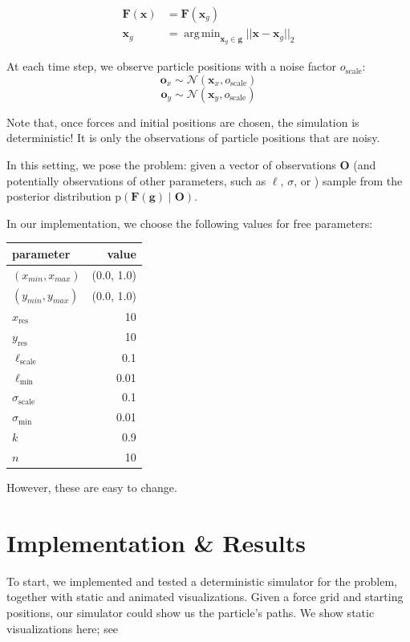 \documentclass[11pt]{article}
\DeclareMathOperator*{\argmin}{arg\,min}
\newcommand{\prob}[0]{\mathrm{p}}
\newcommand{\samples}[0]{\sim}
\newcommand{\given}[0]{\;|\;}
\newcommand{\xv}[0]{\mathbf{x}}
\newcommand{\Fv}[0]{\mathbf{F}}
\newcommand{\xres}[0]{x_{\mathrm{res}}}
\newcommand{\yres}[0]{y_{\mathrm{res}}}
\newcommand{\gv}[0]{\mathbf{g}}
\newcommand{\ov}[0]{\mathbf{o}}
\newcommand{\Ov}[0]{\mathbf{O}}
\newcommand{\scale}[0]{\mathrm{scale}}
\begin{document}
\begin{align*}
\Fv(\xv) &= \Fv(\xv_g) \\
\xv_g &= \argmin_{\xv_g \in \gv} ||\xv - \xv_g||_2
\end{align*}

At each time step, we observe particle positions with a noise factor \(o_{\scale}\):
$$\ov_x \samples \mathcal{N}(\xv_x, o_{\scale})$$
$$\ov_y \samples \mathcal{N}(\xv_y, o_{\scale})$$

Note that, once forces and initial positions are chosen, the simulation is deterministic! It is only the observations of particle positions that are noisy.

In this setting, we pose the problem: given a vector of observations \(\Ov\) (and potentially observations of other parameters, such as \(\ell\), \(\sigma\), or ) sample from the posterior distribution \(\prob(\Fv(\gv) \given \Ov)\).

In our implementation, we choose the following values for free parameters:

\begin{center}
\begin{tabular}{lr}
parameter & value\\
\hline
\((x_{min}, x_{max}) \)  & (0.0, 1.0) \\
\((y_{min}, y_{max}) \)  & (0.0, 1.0) \\
\(\xres              \)  &         10 \\
\(\yres              \)  &         10 \\
\(\ell_{\scale}      \)  &        0.1 \\
\(\ell_{\min}        \)  &       0.01 \\
\(\sigma_{\scale}    \)  &        0.1 \\
\(\sigma_{\min}      \)  &       0.01 \\
\(k\) & 0.9 \\
\(n\) & 10 \\
\end{tabular}
\end{center}

However, these are easy to change.

\section{Implementation \& Results}
\label{sec:org2cd4504}
To start, we implemented and tested a deterministic simulator for the problem, together with static and animated visualizations. Given a force grid and starting positions, our simulator could show us the particle's paths. We show static visualizations here; see
\end{document}
